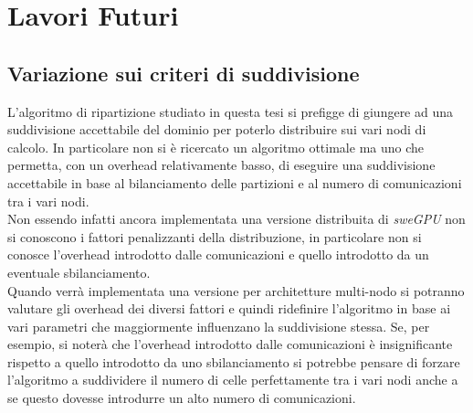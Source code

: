 
\section{Lavori Futuri}

\subsection*{Variazione sui criteri di suddivisione}
L'algoritmo di ripartizione studiato in questa tesi si prefigge di giungere ad una suddivisione accettabile del dominio per poterlo distribuire sui vari nodi di calcolo. In particolare non si è ricercato un algoritmo ottimale ma uno che permetta, con un overhead relativamente basso, di eseguire una suddivisione accettabile in base al bilanciamento delle partizioni e al numero di comunicazioni tra i vari nodi.\\
Non essendo infatti ancora implementata una versione distribuita di \textit{sweGPU} non si conoscono i fattori penalizzanti della distribuzione, in particolare non si conosce l'overhead introdotto dalle comunicazioni e quello introdotto da un eventuale sbilanciamento.\\
Quando verrà implementata una versione per architetture multi-nodo si potranno valutare gli overhead dei diversi fattori e quindi ridefinire l'algoritmo in base ai vari parametri che maggiormente influenzano la suddivisione stessa. Se, per esempio, si noterà che l'overhead introdotto dalle comunicazioni è insignificante rispetto a quello introdotto da uno sbilanciamento si potrebbe pensare di forzare l'algoritmo a suddividere il numero di celle perfettamente tra i vari nodi anche a se questo dovesse introdurre un alto numero di comunicazioni.
